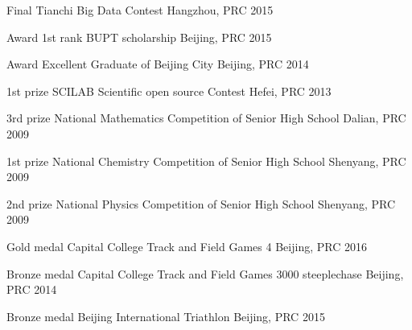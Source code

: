 \begin{cvhonors}

\cvhonor
{Final} %
{Tianchi Big Data Contest} %
{Hangzhou, PRC} %
{2015} %






\cvhonor
{Award} %
{1st rank BUPT scholarship} %
{Beijing, PRC} %
{2015} %


\cvhonor
{Award} %
{Excellent Graduate of Beijing City} %
{Beijing, PRC} %
{2014} %



\cvhonor
{1st prize} %
{SCILAB Scientific open source Contest} %
{Hefei, PRC} %
{2013} %


\cvhonor
{3rd prize} %
{National Mathematics Competition of Senior High School} %
{Dalian, PRC} %
{2009} %

\cvhonor
{1st prize} %
{National Chemistry Competition of Senior High School} %
{Shenyang, PRC} %
{2009} %

\cvhonor
{2nd prize} %
{National Physics Competition of Senior High School} %
{Shenyang, PRC} %
{2009} %

\cvhonor
{Gold medal} %
{Capital College Track and Field Games 4} %
{Beijing, PRC} %
{2016} %

\cvhonor
{Bronze medal} %
{Capital College Track and Field Games 3000 steeplechase} %
{Beijing, PRC} %
{2014} %

\cvhonor
{Bronze medal} %
{Beijing International Triathlon} %
{Beijing, PRC} %
{2015} %


\end{cvhonors}
